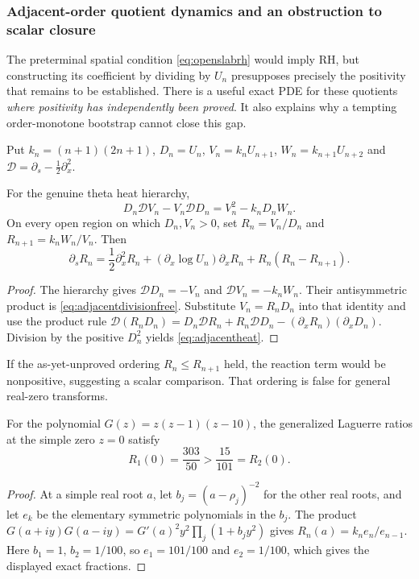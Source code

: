 \subsubsection{Adjacent-order quotient dynamics and an obstruction to scalar closure}
\label{subsec:adjacentratio}
The preterminal spatial condition
\eqref{eq:openslabrh} would imply RH, but constructing its
coefficient by dividing by $U_n$ presupposes precisely
the positivity that remains to be established.
There is a useful exact PDE for these quotients
\emph{where positivity has independently been proved}.
It also explains why a tempting order-monotone
bootstrap cannot close this gap.

Put $k_n=(n+1)(2n+1)$,
$D_n=U_n$, $V_n=k_nU_{n+1}$,
$W_n=k_{n+1}U_{n+2}$ and
$\mathcal D=\partial_s-\frac12\partial_x^2$.

\begin{theorem}
\label{thm:adjacentratio}
For the genuine theta heat hierarchy,
\begin{equation}
\boxed{D_n\mathcal D V_n-V_n\mathcal D D_n
=V_n^2-k_nD_nW_n.}
\label{eq:adjacentdivisionfree}
\end{equation}
On every open region on which $D_n,V_n>0$,
set $R_n=V_n/D_n$ and
$R_{n+1}=k_nW_n/V_n$.
Then
\begin{equation}
\boxed{
\partial_s R_n=\frac12\partial_x^2R_n
+(\partial_x\log U_n)\partial_xR_n
+R_n(R_n-R_{n+1}).}
\label{eq:adjacentheat}
\end{equation}
\end{theorem}
\begin{proof}
The hierarchy gives $\mathcal D D_n=-V_n$
and $\mathcal D V_n=-k_nW_n$.
Their antisymmetric product is
\eqref{eq:adjacentdivisionfree}.
Substitute $V_n=R_nD_n$ into that identity
and use the product rule
$\mathcal D(R_nD_n)=D_n\mathcal DR_n+
R_n\mathcal DD_n-(\partial_xR_n)(\partial_xD_n)$.
Division by the positive $D_n^2$ yields
\eqref{eq:adjacentheat}.
\end{proof}

If the as-yet-unproved ordering
$R_n\le R_{n+1}$ held, the reaction term
would be nonpositive, suggesting a
scalar comparison. That ordering is
false for general real-zero transforms.

\begin{proposition}
\label{prop:ratioreversal}
For the polynomial $G(z)=z(z-1)(z-10)$,
the generalized Laguerre ratios at the simple
zero $z=0$ satisfy
\[
\boxed{R_1(0)=\frac{303}{50}>
\frac{15}{101}=R_2(0).}
\]
\end{proposition}
\begin{proof}
At a simple real root $a$, let
$b_j=(a-\rho_j)^{-2}$ for the other
real roots, and let $e_k$ be the
elementary symmetric polynomials in
the $b_j$. The product
$G(a+iy)G(a-iy)=G'(a)^2y^2
\prod_j(1+b_jy^2)$ gives
$R_n(a)=k_ne_n/e_{n-1}$.
Here $b_1=1$, $b_2=1/100$, so
$e_1=101/100$ and $e_2=1/100$,
which gives the displayed exact fractions.
\end{proof}

